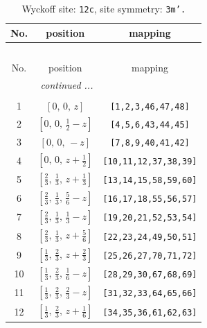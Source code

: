 \documentclass[fleqn,8pt]{jsarticle}
\begin{document}
\begin{longtable}{ccc}
\caption{Wyckoff site: {\tt 12c}, site symmetry: {\tt 3m'.}}
 \\
 \hline \hline
No. & position & mapping \\ \hline \endfirsthead

\multicolumn{2}{l}{\tablename\ \thetable{}} \\
 \hline \hline
No. & position & mapping \\ \hline \endhead

 \hline \hline
\multicolumn{2}{r}{\footnotesize\it continued ...} \\ \endfoot

 \hline \hline
\multicolumn{2}{r}{} \\ \endlastfoot

1 & $\left[ 0,\, 0,\, z \right]$ & {\tt [1,2,3,46,47,48]} \\ \hline
2 & $\left[ 0,\, 0,\, \frac{1}{2} - z \right]$ & {\tt [4,5,6,43,44,45]} \\ \hline
3 & $\left[ 0,\, 0,\, - z \right]$ & {\tt [7,8,9,40,41,42]} \\ \hline
4 & $\left[ 0,\, 0,\, z + \frac{1}{2} \right]$ & {\tt [10,11,12,37,38,39]} \\ \hline
5 & $\left[ \frac{2}{3},\, \frac{1}{3},\, z + \frac{1}{3} \right]$ & {\tt [13,14,15,58,59,60]} \\ \hline
6 & $\left[ \frac{2}{3},\, \frac{1}{3},\, \frac{5}{6} - z \right]$ & {\tt [16,17,18,55,56,57]} \\ \hline
7 & $\left[ \frac{2}{3},\, \frac{1}{3},\, \frac{1}{3} - z \right]$ & {\tt [19,20,21,52,53,54]} \\ \hline
8 & $\left[ \frac{2}{3},\, \frac{1}{3},\, z + \frac{5}{6} \right]$ & {\tt [22,23,24,49,50,51]} \\ \hline
9 & $\left[ \frac{1}{3},\, \frac{2}{3},\, z + \frac{2}{3} \right]$ & {\tt [25,26,27,70,71,72]} \\ \hline
10 & $\left[ \frac{1}{3},\, \frac{2}{3},\, \frac{1}{6} - z \right]$ & {\tt [28,29,30,67,68,69]} \\ \hline
11 & $\left[ \frac{1}{3},\, \frac{2}{3},\, \frac{2}{3} - z \right]$ & {\tt [31,32,33,64,65,66]} \\ \hline
12 & $\left[ \frac{1}{3},\, \frac{2}{3},\, z + \frac{1}{6} \right]$ & {\tt [34,35,36,61,62,63]} \\
\end{longtable}
\renewcommand{\arraystretch}{1.2}
\end{document}

